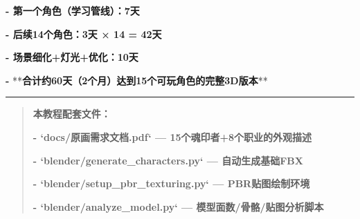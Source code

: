 \documentclass[12pt,a4paper,openany]{ctexbook}
\begin{document}
\textbf{- 第一个角色（学习管线）：7天}

\textbf{- 后续14个角色：3天 × 14 = 42天}

\textbf{- 场景细化+灯光+优化：10天}

\textbf{- }**\textbf{合计约60天（2个月）达到15个可玩角色的完整3D版本}**


\bigskip\hrule\bigskip


\begin{quote}
\textbf{本教程配套文件：}

\textbf{- `docs/原画需求文档.pdf` — 15个魂印者+8个职业的外观描述}

\textbf{- `blender/generate\_characters.py` — 自动生成基础FBX}

\textbf{- `blender/setup\_pbr\_texturing.py` — PBR贴图绘制环境}

\textbf{- `blender/analyze\_model.py` — 模型面数/骨骼/贴图分析脚本}

\end{quote}
\end{document}
